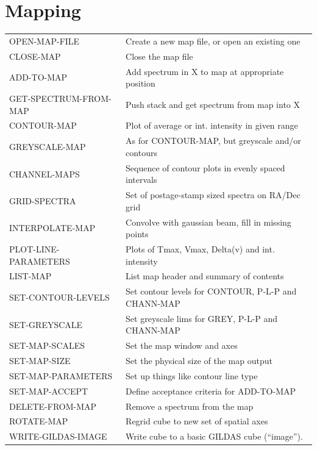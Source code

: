 \documentclass[11pt,twoside]{report}
\begin{document}
\section{Mapping} 

\begin{tabular}{ll}
OPEN-MAP-FILE           & Create a new map file, or open an existing one\\
CLOSE-MAP               & Close the map file\\
ADD-TO-MAP              & Add spectrum in X to map at appropriate position\\
GET-SPECTRUM-FROM-MAP   & Push stack and get spectrum from map into X\\
CONTOUR-MAP             & Plot of average or int. intensity in given range\\
GREYSCALE-MAP           & As for CONTOUR-MAP, but greyscale and/or contours\\
CHANNEL-MAPS            & Sequence of contour plots in evenly spaced intervals\\
GRID-SPECTRA            & Set of postage-stamp sized spectra on RA/Dec grid\\
INTERPOLATE-MAP         & Convolve with gaussian beam, fill in missing points\\
PLOT-LINE-PARAMETERS    & Plots of Tmax, Vmax, Delta(v) and int. intensity\\
LIST-MAP                & List map header and summary of contents\\
SET-CONTOUR-LEVELS      & Set contour levels for CONTOUR, P-L-P and CHANN-MAP\\
SET-GREYSCALE           & Set greyscale lims for GREY, P-L-P and CHANN-MAP\\
SET-MAP-SCALES          & Set the map window and axes\\
SET-MAP-SIZE            & Set the physical size of the map output\\
SET-MAP-PARAMETERS      & Set up things like contour line type\\
SET-MAP-ACCEPT          & Define acceptance criteria for ADD-TO-MAP\\
DELETE-FROM-MAP         & Remove a spectrum from the map\\
ROTATE-MAP              & Regrid cube to new set of spatial axes\\
WRITE-GILDAS-IMAGE      & Write cube to a basic GILDAS cube (``image'').\\
\end{tabular}
\end{document}
